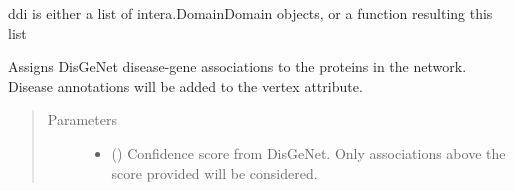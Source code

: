 \documentclass[letterpaper,10pt,english]{sphinxmanual}
\begin{document}
\begin{fulllineitems}

\begin{fulllineitems}
\label{\detokenize{main:pypath.main.PyPath.load_dbptm}}
\end{fulllineitems}


\begin{fulllineitems}
\label{\detokenize{main:pypath.main.PyPath.load_ddi}}
ddi is either a list of intera.DomainDomain objects,
or a function resulting this list

\end{fulllineitems}


\begin{fulllineitems}
\label{\detokenize{main:pypath.main.PyPath.load_ddis}}
\end{fulllineitems}


\begin{fulllineitems}
\label{\detokenize{main:pypath.main.PyPath.load_depod_dmi}}
\end{fulllineitems}


\begin{fulllineitems}
\label{\detokenize{main:pypath.main.PyPath.load_disgenet}}
Assigns DisGeNet disease-gene associations to the proteins
in the network. Disease annotations will be added to the 
vertex attribute.
\begin{quote}\begin{description}
\item[{Parameters}] \leavevmode\begin{itemize}
\item {} 
 () \textendash{} Confidence score from DisGeNet. Only associations
above the score provided will be considered.


\end{itemize}
\end{description}
\end{quote}
\end{fulllineitems}
\end{fulllineitems}
\end{document}

